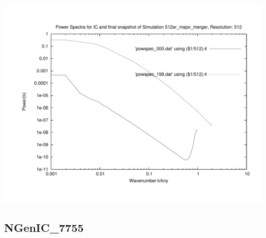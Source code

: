 \includegraphics[scale=0.5]{r512/512er_major_merger/plot_powspec_512er_major_merger.pdf}


% 
%
%
%
%
%
%
%

\newpage
\subsection{NGenIC\_7755} 

